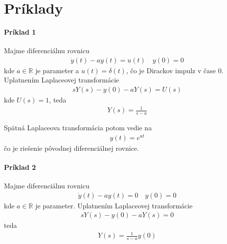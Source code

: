 \documentclass[a4paper, 10pt, ]{article}
\begin{document}
\section{Príklady}



\paragraph{Príklad 1}

Majme diferenciálnu rovnicu
\begin{align}
    \dot y(t) - a y(t) = u(t) \quad y(0) = 0
\end{align}
kde $a \in \mathbb R$ je parameter a $u(t) = \delta(t)$, čo je Dirackov impulz v čase $0$. Uplatnením Laplaceovej transformácie
\begin{align}
    sY(s) - y(0) - a Y(s) = U(s)
\end{align}
kde $U(s) = 1$, teda
\begin{align}
    Y(s) = \frac{1}{s - a}
\end{align}

Spätná Laplaceova transformácia potom vedie na
\begin{align}
    y(t) = e^{at}
\end{align}
čo je riešenie pôvodnej diferenciálnej rovnice.



\paragraph{Príklad 2}

Majme diferenciálnu rovnicu
\begin{align}
    \dot y(t) - a y(t) = 0 \quad y(0) = 0
\end{align}
kde $a \in \mathbb R$ je parameter. Uplatnením Laplaceovej transformácie
\begin{align}
    sY(s) - y(0) - a Y(s) = 0
\end{align}
teda
\begin{align}
    Y(s) = \frac{1}{s - a} y(0)
\end{align}
\end{document}

